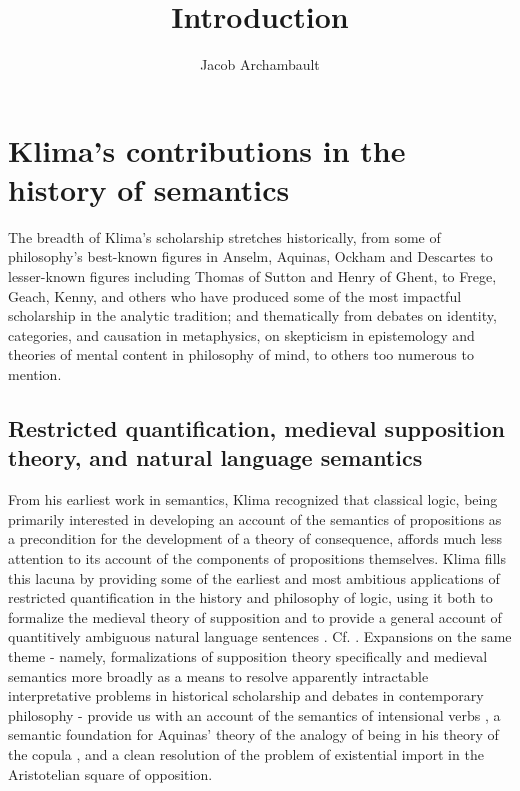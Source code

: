 \documentclass[]{article}
\title{Introduction}
\author{Jacob Archambault}
\begin{document}
\maketitle

\begin{abstract}

\end{abstract}

\section{Klima's contributions in the history of semantics}
The breadth of Klima's scholarship stretches 
historically, from some of philosophy's best-known figures in Anselm, Aquinas, Ockham and Descartes 
to lesser-known figures including Thomas of Sutton and Henry of Ghent, 
to Frege, Geach, Kenny, and others who have produced some of the most impactful scholarship in the analytic tradition; 
and 
thematically from debates 
on identity, categories, and causation in metaphysics, 
on skepticism in epistemology and theories of mental content in philosophy of mind, 
to others too numerous to mention. 
\subsection{Restricted quantification, medieval supposition theory, and natural language semantics}
From his earliest work in semantics, 
Klima recognized that classical logic, 
being primarily interested in developing an account of the semantics of propositions as a precondition for the development of a theory of consequence, 
affords much less attention to its account of the components of propositions themselves.
Klima fills this lacuna by providing some of the earliest and most ambitious applications of restricted quantification in the history and philosophy of logic, 
using it both to formalize the medieval theory of supposition 
and to provide a general account of quantitively ambiguous natural language sentences \autocite{Klima1988,Klima1990,KlimaSandu1990,Klima1991b}. Cf. \autocite{Parsons2014}. 
Expansions on the same theme - 
namely, formalizations of supposition theory specifically 
and medieval semantics more broadly 
as a means to resolve apparently intractable interpretative problems in historical scholarship 
and debates in contemporary philosophy - 
provide us with an account of the semantics of intensional verbs \autocite{Klima1991}, 
a semantic foundation for Aquinas' theory of the analogy of being in his theory of the copula \autocite{Klima1996,Klima2002}, 
and a clean resolution of the problem of existential import in the Aristotelian square of opposition\autocite{Klima2001}. 
\end{document}

